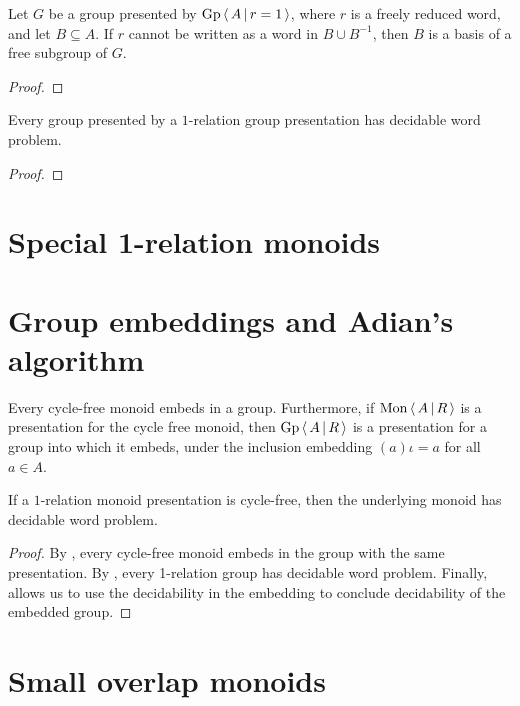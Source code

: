 \begin{lemma}\label{lem:Freiheitssatz}
	Let $G$ be a group presented by $\mathrm{Gp}\left\langle\, A \,\middle|\, r = 1 \,\right\rangle$, where $r$ is a freely reduced word, and let $B\subseteq A$.
	If $r$ cannot be written as a word in $B\cup B^{-1}$, then $B$ is a basis of a free subgroup of $G$.
\end{lemma}
\begin{proof}
\end{proof}


\begin{theorem}\label{thm:group_1rel_dec}
	Every group presented by a $1$-relation group presentation has decidable word problem.
\end{theorem}
\begin{proof}
\end{proof}

\chapter{Special 1-relation monoids}\label{chap:special_1_rel_monoids}

\chapter{Group embeddings and Adian's algorithm}\label{chap:group_embeddings_and_adians_algorithm}

\begin{theorem}\label{thm:cycle_free_embeds_group}
	Every cycle-free monoid embeds in a group. Furthermore, if $\mathrm{Mon}\left\langle\, A \,\middle|\, R \,\right\rangle$ is a presentation for the cycle free
	monoid, then $\mathrm{Gp}\left\langle\, A \,\middle|\, R \,\right\rangle$ is a presentation for a group into which it embeds, under the inclusion embedding
	$(a)\iota = a$ for all $a\in A$.
\end{theorem}

\begin{theorem}\label{thm:cycle_free_1rel_dec}
	\rocqok{}
	If a $1$-relation monoid presentation is cycle-free, then the underlying monoid has decidable word problem.
\end{theorem}
\begin{proof}
	By , every cycle-free monoid embeds in the group with the same presentation.
	By , every 1-relation group has decidable word problem. Finally,
	allows us to use the decidability in the embedding to conclude decidability of the embedded group.
\end{proof}

\chapter{Small overlap monoids}\label{chap:small_overlap}



